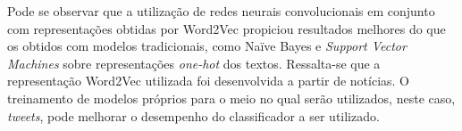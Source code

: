 Pode se observar que a utilização de redes neurais convolucionais em conjunto com representações obtidas por
Word2Vec propiciou resultados melhores do que os obtidos com modelos tradicionais, como Naïve Bayes e
\textit{Support Vector Machines} sobre representações \textit{one-hot} dos textos.
Ressalta-se que a representação Word2Vec utilizada foi desenvolvida a partir de notícias.
O treinamento de modelos próprios para o meio no qual serão utilizados, neste caso, \textit{tweets}, pode melhorar o
desempenho do classificador a ser utilizado.
